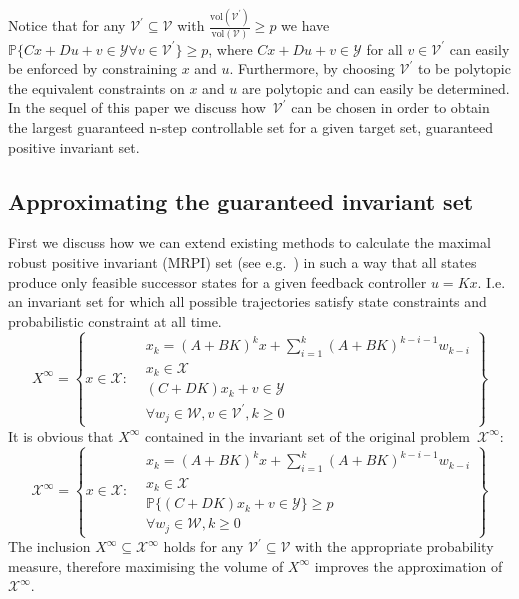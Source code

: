 \documentclass{ifacconf}
\providecommand{\vol}{\text{vol}}
\providecommand{\W}{\mathcal W}
\providecommand{\V}{\mathcal V}
\providecommand{\X}{\mathcal X}
\providecommand{\Y}{\mathcal Y}
\providecommand{\PP}{\mathbb P}
\begin{document}
Notice that for any $\V^\prime\subseteq\V$ with $\frac{\vol(\V^\prime)}{\vol(\V)}\geq p$ we have $\PP\{Cx+Du + v\in\Y\forall v\in\V^\prime\}\geq p$, where $Cx+Du+v\in\Y$ for all $v\in\V^\prime$ can easily be enforced by constraining $x$ and $u$.
%
Furthermore, by choosing $\V^\prime$ to be polytopic the equivalent constraints on $x$ and $u$ are polytopic and can easily be determined.
%
In the sequel of this paper we discuss how~$\V^\prime$ can be chosen in order to obtain the largest guaranteed n-step controllable set for a given target set, guaranteed positive invariant set.


\subsection{Approximating the guaranteed invariant set}\label{ssec:approximating:MRPI}
%
First we discuss how we can extend existing methods to calculate the maximal robust positive invariant (MRPI) set (see e.g.~\cite{blanchini:2007}) in such a way that all states produce only feasible successor states for a given feedback controller $u = Kx$.
%
I.e. an invariant set for which all possible trajectories satisfy state constraints and probabilistic constraint at all time.
%
\begin{equation}\label{eq:alternative:MRPI:set}
	X^\infty = \left\{x\in\X: \begin{aligned}&x_k = (A+BK)^k x + \sum_{i=1}^{k} (A+BK)^{k-i-1} w_{k-i}\\
	&x_k\in\X\\
	&(C+DK)x_k+v\in\Y\\
	&\forall w_j\in\W,v\in \V^\prime,k\geq 0\end{aligned} \right\}
\end{equation}
%
It is obvious that $X^\infty$ contained in the invariant set of the original problem~$\X^\infty$:
%
\begin{equation}
	\X^\infty = \left\{x\in\X: \begin{aligned}&x_k = (A+BK)^k x + \sum_{i=1}^{k} (A+BK)^{k-i-1} w_{k-i}\\
	&x_k\in\X\\
	&\PP\{(C+DK)x_k+v\in\Y\}\geq p\\
	&\forall w_j\in\W,k\geq 0\end{aligned} \right\}
\end{equation}
%
The inclusion $X^\infty\subseteq\X^\infty$ holds for any $\V^\prime\subseteq\V$ with the appropriate probability measure, therefore maximising the volume of $X^\infty$ improves the approximation of $\X^\infty$.
\end{document}
